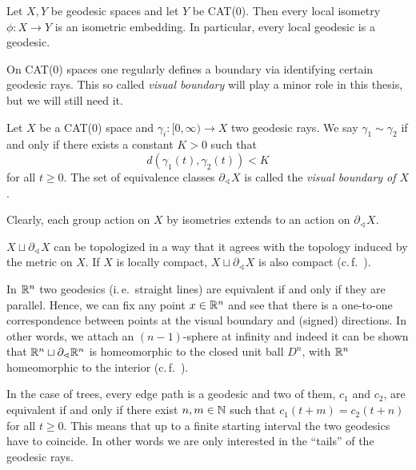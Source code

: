 \begin{prop}
  Let \(X,Y\) be geodesic spaces and let \(Y\) be CAT(0). Then every local isometry \(\phi \colon X \to Y\) is an isometric embedding. In particular, every local geodesic is a geodesic.
\end{prop}

On CAT(0) spaces one regularly defines a boundary via identifying certain geodesic rays. This so called \emph{visual boundary} will play a minor role in this thesis, but we will still need it. 

\begin{defin}
  \label{defin:visual}
  Let \(X\) be a CAT(0) space and \(\gamma_i \colon [0, \infty) \to X\) two geodesic rays. We say \(\gamma_1 \sim \gamma_2\) if and only if there exists a constant \(K > 0 \) such that
  \[
    d(\gamma_1(t), \gamma_2(t)) < K
  \]
  for all \(t \geq 0\). The set of equivalence classes \(\partial_\sphericalangle X\) is called the \emph{visual boundary of \(X\)}.

  Clearly, each group action on \(X\) by isometries extends to an action on \(\partial_\sphericalangle X\).
\end{defin}

\begin{rem}
  \(X \sqcup \partial_{\sphericalangle}X\) can be topologized in a way that it agrees with the topology induced by the metric on \(X\). If \(X\) is locally compact, \(X \sqcup \partial_\sphericalangle X\) is also compact (c.\,f.~\cite[Sec.~II.8]{MR1744486}).
\end{rem}

\begin{bsp}
  In \(\mathbb{R}^n\) two geodesics (i.\,e.\ straight lines) are equivalent if and only if they are parallel. Hence, we can fix any point \(x \in \mathbb{R}^n\) and see that there is a one-to-one correspondence between points at the visual boundary and (signed) directions. In other words, we attach an \((n-1)\)-sphere at infinity and indeed it can be shown that \(\mathbb{R}^n \sqcup \partial_\sphericalangle \mathbb{R}^n\) is homeomorphic to the closed unit ball \(D^n\), with \(\mathbb{R}^n\) homeomorphic to the interior (c.\,f.~\cite[Section~II.8]{MR1744486}).
\end{bsp}
\begin{bsp}[Trees]
  In the case of trees, every edge path is a geodesic and two of them, \(c_1\) and \(c_2\), are equivalent if and only if there exist \(n,m \in \mathbb{N}\) such that \(c_1(t+m) = c_2(t+n)\) for all \(t\geq0\). This means that up to a finite starting interval the two geodesics have to coincide. In other words we are only interested in the \enquote{tails} of the geodesic rays.
\end{bsp}

